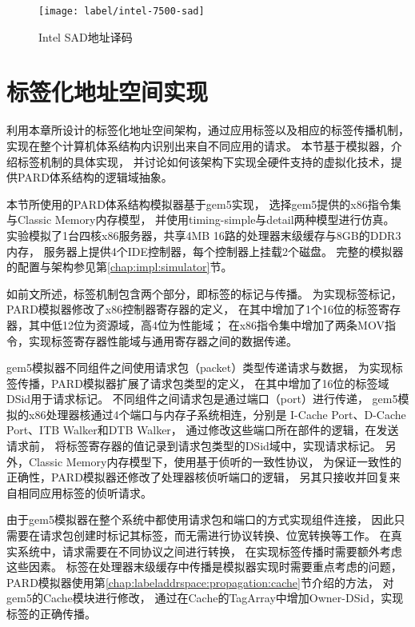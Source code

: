\begin{figure}[tb]
  \centering
  \texttt{[image: label/intel-7500-sad]}
  \caption[Intel SAD地址译码]{Intel SAD地址译码\cite{intel-xeon-7500}}
  \label{fig:intel-7500-sad}
\end{figure}


\section{标签化地址空间实现}
\label{chap:labeladdrspace:nohype}

利用本章所设计的标签化地址空间架构，通过应用标签以及相应的标签传播机制，
实现在整个计算机体系结构内识别出来自不同应用的请求。
本节基于模拟器，介绍标签机制的具体实现，
并讨论如何该架构下实现全硬件支持的虚拟化技术，提供PARD体系结构的逻辑域抽象。

本节所使用的PARD体系结构模拟器基于gem5\cite{binkert_gem5_2011}实现，
选择gem5提供的x86指令集与Classic Memory内存模型，
并使用timing-simple与detail两种模型进行仿真。
实验模拟了1台四核x86服务器，共享4MB 16路的处理器末级缓存与8GB的DDR3内存，
服务器上提供4个IDE控制器，每个控制器上挂载2个磁盘。
完整的模拟器的配置与架构参见第\ref{chap:impl:simulator}节。

如前文所述，标签机制包含两个部分，即标签的标记与传播。
为实现标签标记，PARD模拟器修改了x86控制器寄存器的定义，
在其中增加了1个16位的标签寄存器，其中低12位为资源域，高4位为性能域；
在x86指令集中增加了两条MOV指令，实现标签寄存器性能域与通用寄存器之间的数据传递。

gem5模拟器不同组件之间使用请求包（packet）类型传递请求与数据，
为实现标签传播，PARD模拟器扩展了请求包类型的定义，
在其中增加了16位的标签域DSid用于请求标记。
不同组件之间请求包是通过端口（port）进行传递，
gem5模拟的x86处理器核通过4个端口与内存子系统相连，分别是
I-Cache Port、D-Cache Port、ITB Walker和DTB Walker，
通过修改这些端口所在部件的逻辑，在发送请求前，
将标签寄存器的值记录到请求包类型的DSid域中，实现请求标记。
另外，Classic Memory内存模型下，使用基于侦听的一致性协议，
为保证一致性的正确性，PARD模拟器还修改了处理器核侦听端口的逻辑，
另其只接收并回复来自相同应用标签的侦听请求。

由于gem5模拟器在整个系统中都使用请求包和端口的方式实现组件连接，
因此只需要在请求包创建时标记其标签，而无需进行协议转换、位宽转换等工作。
在真实系统中，请求需要在不同协议之间进行转换，
在实现标签传播时需要额外考虑这些因素。
标签在处理器末级缓存中传播是模拟器实现时需要重点考虑的问题，
PARD模拟器使用第\ref{chap:labeladdrspace:propagation:cache}节介绍的方法，
对gem5的Cache模块进行修改，
通过在Cache的TagArray中增加Owner-DSid，实现标签的正确传播。


